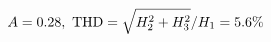 \documentclass[preview]{standalone}
\begin{document}
\begin{align*}
\special{dvisvgm:raw <g id='unique000'>}A=0.28,\ \text{THD}=\sqrt{H_2^2+H_3^2}/H_1=5.6\%\special{dvisvgm:raw </g>}
\end{align*}
\end{document}
